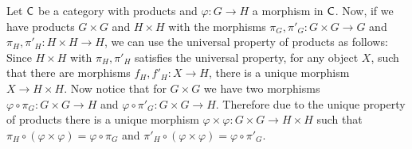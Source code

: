 \begin{solution}
	Let $\mathsf{C}$ be a category with products and $\varphi: G \to H$ a morphism in $\mathsf{C}$. Now, if we have products $G \times G$ and $H \times H$ with the morphisms $\pi_G,\pi'_G: G \times G \to G$ and $\pi_H,\pi'_H: H \times H \to H$, we can use the universal property of products as follows: Since $H \times H$ with $\pi_H,\pi'_H$ satisfies the universal property, for any object $X$, such that there are morphisms $f_H,f'_H: X \to H$, there is a unique morphism $X \to H \times H$. Now notice that for $G \times G$ we have two morphisms $\varphi \circ \pi_G: G \times G \to H$ and $\varphi \circ \pi'_G: G \times G \to H$. Therefore due to the unique property of products there is a unique morphism $\varphi \times \varphi: G \times G \to H \times H$ such that $\pi_H \circ (\varphi \times \varphi) = \varphi \circ \pi_G$ and $\pi'_H \circ (\varphi \times \varphi) = \varphi \circ \pi'_G$.
\end{solution}

\begin{problem}
\end{problem}

